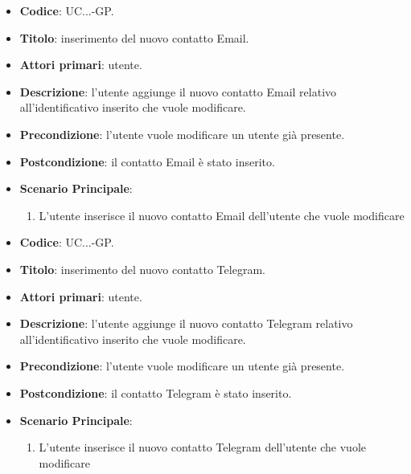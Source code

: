 				
				\begin{itemize}
					\item \textbf{Codice}: UC\theuccount.\thesubuccount.\thesubsubuccount.\thesubsubsubuccount-GP.
					\item \textbf{Titolo}: inserimento del nuovo contatto Email.
					\item \textbf{Attori primari}: utente.
					\item \textbf{Descrizione}: l'utente aggiunge il nuovo contatto Email relativo all'identificativo inserito che vuole modificare.
					\item \textbf{Precondizione}: l'utente vuole modificare un utente già presente.
					\item \textbf{Postcondizione}: il contatto Email è stato inserito.
					\item \textbf{Scenario Principale}:
					\begin{enumerate}
						\item L'utente inserisce il nuovo contatto Email dell'utente che vuole modificare
					\end{enumerate}
				\end{itemize}
			
				
				\begin{itemize}
					\item \textbf{Codice}: UC\theuccount.\thesubuccount.\thesubsubuccount.\thesubsubsubuccount-GP.
					\item \textbf{Titolo}: inserimento del nuovo contatto Telegram.
					\item \textbf{Attori primari}: utente.
					\item \textbf{Descrizione}: l'utente aggiunge il nuovo contatto Telegram relativo all'identificativo inserito che vuole modificare.
					\item \textbf{Precondizione}: l'utente vuole modificare un utente già presente.
					\item \textbf{Postcondizione}: il contatto Telegram è stato inserito.
					\item \textbf{Scenario Principale}:
					\begin{enumerate}
						\item L'utente inserisce il nuovo contatto Telegram dell'utente che vuole modificare
					\end{enumerate}
				\end{itemize}
			
